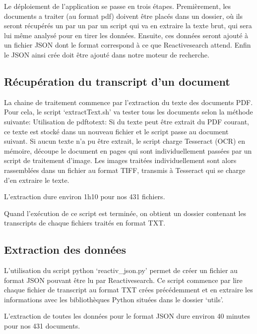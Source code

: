 

Le déploiement de l'application se passe en trois étapes.
Premièrement, les documents a traiter (au format pdf) doivent être placés dans un dossier, où ils seront récupérés un par un par un script qui va en extraire la texte brut, qui sera lui même analysé pour en tirer les données.
Ensuite, ces données seront ajouté à un fichier JSON dont le format correspond à ce que Reactivesearch attend.
Enfin le JSON ainsi crée doit être ajouté dans notre moteur de recherche.

\subsection{Récupération du transcript d'un document}
La chaine de traitement commence par l'extraction du texte des documents PDF.
Pour cela, le script `extractText.sh' va tester tous les documents selon la méthode suivante:\newline
Utilisation de pdftotext: Si du texte peut être extrait du PDF courant, ce texte est stocké dans un nouveau fichier et le script passe au document suivant.\newline
Si aucun texte n'a pu être extrait, le script charge Tesseract (\gls{OCR}) en mémoire, découpe le document en pages qui sont individuellement passées par un script de traitement d'image.
Les images traitées individuellement sont alors rassemblées dans un fichier au format TIFF, transmis à Tesseract qui se charge d'en extraire le texte.

L'extraction dure environ 1h10 pour nos 431 fichiers.

Quand l'exécution de ce script est terminée, on obtient un dossier contenant les transcripts de chaque fichiers traités en format TXT\@.

\subsection{Extraction des données}
L'utilisation du script python `reactiv\_json.py' permet de créer un fichier au format JSON pouvant être lu par Reactivesearch.
Ce script commence par lire chaque fichier de transcript au format TXT crées précédemment et en extraire les informations avec les bibliothèques Python situées dans le dossier `utils'.

L'extraction de toutes les données pour le format JSON dure environ 40 minutes pour nos 431 documents.

